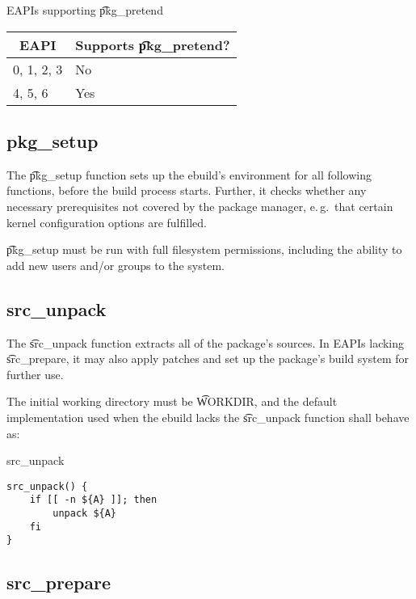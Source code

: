 \begin{centertable}{EAPIs supporting \t{pkg\_pretend}}
    \label{tab:pkg-pretend-table}
    \begin{tabular}{ll}
      \toprule
      \multicolumn{1}{c}{\textbf{EAPI}} &
      \multicolumn{1}{c}{\textbf{Supports \t{pkg\_pretend}?}} \\
      \midrule
      0, 1, 2, 3        & No  \\
      4, 5, 6           & Yes \\
      \bottomrule
    \end{tabular}
\end{centertable}

\subsection{pkg\_setup}

The \t{pkg\_setup} function sets up the ebuild's environment for all following functions, before
the build process starts. Further, it checks whether any necessary prerequisites not covered
by the package manager, e.\,g.\ that certain kernel configuration options are fulfilled.

\t{pkg\_setup} must be run with full filesystem permissions, including the ability to add new users
and/or groups to the system.

\subsection{src\_unpack}

The \t{src\_unpack} function extracts all of the package's sources. In EAPIs lacking
\t{src\_prepare}, it may also apply patches and set up the package's build system for further use.

The initial working directory must be \t{WORKDIR}, and the default implementation used when
the ebuild lacks the \t{src\_unpack} function shall behave as:

\begin{listing}[H]
\caption{src\_unpack}
\begin{verbatim}
src_unpack() {
    if [[ -n ${A} ]]; then
        unpack ${A}
    fi
}
\end{verbatim}
\end{listing}

\subsection{src\_prepare}

